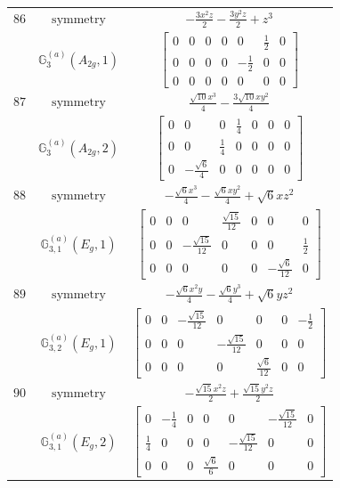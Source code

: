 \documentclass[fleqn,8pt,landscape]{jsarticle}
\begin{document}
\begin{longtable}{ccc}
$ 86 $ & $ \text{symmetry} $ & $ - \frac{3 x^{2} z}{2} - \frac{3 y^{2} z}{2} + z^{3} $ \\
$  $ & $ \mathbb{G}_{3}^{(a)}(A_{2g},1) $ & $ \begin{bmatrix} 0 & 0 & 0 & 0 & 0 & \frac{1}{2} & 0 \\ 0 & 0 & 0 & 0 & - \frac{1}{2} & 0 & 0 \\ 0 & 0 & 0 & 0 & 0 & 0 & 0 \end{bmatrix} $ \\ \hline
$ 87 $ & $ \text{symmetry} $ & $ \frac{\sqrt{10} x^{3}}{4} - \frac{3 \sqrt{10} x y^{2}}{4} $ \\
$  $ & $ \mathbb{G}_{3}^{(a)}(A_{2g},2) $ & $ \begin{bmatrix} 0 & 0 & 0 & \frac{1}{4} & 0 & 0 & 0 \\ 0 & 0 & \frac{1}{4} & 0 & 0 & 0 & 0 \\ 0 & - \frac{\sqrt{6}}{4} & 0 & 0 & 0 & 0 & 0 \end{bmatrix} $ \\ \hline
$ 88 $ & $ \text{symmetry} $ & $ - \frac{\sqrt{6} x^{3}}{4} - \frac{\sqrt{6} x y^{2}}{4} + \sqrt{6} x z^{2} $ \\
$  $ & $ \mathbb{G}_{3,1}^{(a)}(E_{g},1) $ & $ \begin{bmatrix} 0 & 0 & 0 & \frac{\sqrt{15}}{12} & 0 & 0 & 0 \\ 0 & 0 & - \frac{\sqrt{15}}{12} & 0 & 0 & 0 & \frac{1}{2} \\ 0 & 0 & 0 & 0 & 0 & - \frac{\sqrt{6}}{12} & 0 \end{bmatrix} $ \\ \hline
$ 89 $ & $ \text{symmetry} $ & $ - \frac{\sqrt{6} x^{2} y}{4} - \frac{\sqrt{6} y^{3}}{4} + \sqrt{6} y z^{2} $ \\
$  $ & $ \mathbb{G}_{3,2}^{(a)}(E_{g},1) $ & $ \begin{bmatrix} 0 & 0 & - \frac{\sqrt{15}}{12} & 0 & 0 & 0 & - \frac{1}{2} \\ 0 & 0 & 0 & - \frac{\sqrt{15}}{12} & 0 & 0 & 0 \\ 0 & 0 & 0 & 0 & \frac{\sqrt{6}}{12} & 0 & 0 \end{bmatrix} $ \\ \hline
$ 90 $ & $ \text{symmetry} $ & $ - \frac{\sqrt{15} x^{2} z}{2} + \frac{\sqrt{15} y^{2} z}{2} $ \\
$  $ & $ \mathbb{G}_{3,1}^{(a)}(E_{g},2) $ & $ \begin{bmatrix} 0 & - \frac{1}{4} & 0 & 0 & 0 & - \frac{\sqrt{15}}{12} & 0 \\ \frac{1}{4} & 0 & 0 & 0 & - \frac{\sqrt{15}}{12} & 0 & 0 \\ 0 & 0 & 0 & \frac{\sqrt{6}}{6} & 0 & 0 & 0 \end{bmatrix} $ \\ \hline

\end{longtable}
\end{document}
